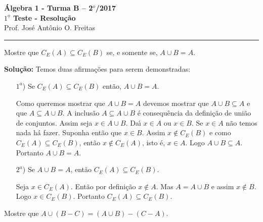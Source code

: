 \documentclass[12pt]{article}
\begin{document}


\begin{center}
{\Large\bf {\'A}lgebra 1 - Turma B -- 2$^{o}$/2017} \\ \vspace{9pt} {\large\bf
  $1^{\underline{o}}$ Teste - Resolu\c{c}\~ao}\\
\vspace{9pt} Prof. Jos{\'e} Ant{\^o}nio O. Freitas
\end{center}
\hrule

\vspace{.6cm}


\vspace{.6cm}

\questao Mostre que $C_E(A) \subseteq C_E(B)$ se, e somente se, $A \cup B = A$.

\noindent\textbf{Solu\c{c}\~ao:} Temos duas afirma\c{c}\~oes para serem demonstradas:
\begin{enumerate}
	\item[$1^a$)] Se $C_E(A) \subseteq C_E(B)$ ent\~ao, $A \cup B = A$.

	Como queremos mostrar que $A \cup B = A$ devemos mostrar que $A \cup B \subseteq A$ e que $A \subseteq A \cup B$. A inclus\~ao $A \subseteq A \cup B$ \'e consequ\^encia da defini\c{c}\~ao de uni\~ao de conjuntos. Assim seja $x \in A \cup B$. Da{\'\i} $x \in A$ ou $x \in B$. Se $x \in A$ n\~ao temos nada h\'a fazer. Suponha ent\~ao que $x \in B$. Assim $x \notin C_E(B)$ e como $C_E(A) \subseteq C_E(B)$, ent\~ao $x \notin C_E(A)$, isto \'e, $x \in A$. Logo $A \cup B \subseteq A$. Portanto $A \cup B = A$.

	\item[$2^a$)] Se $A \cup B = A$, ent\~ao $C_E(A) \subseteq C_E(B)$.

	Seja $x \in C_E(A)$. Ent\~ao por defini\c{c}\~ao $x \notin A$. Mas $A = A \cup B$ e assim $x \notin B$. Logo $x \in C_E(B)$. Portanto $C_E(A) \subseteq C_E(B)$.
\end{enumerate}

\vspace{.5cm}

\questao Mostre que $A \cup ( B - C) = (A \cup B) - (C - A)$.
\end{document}
